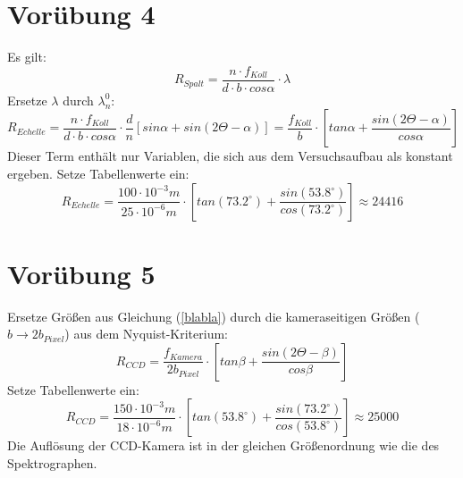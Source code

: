 \documentclass[titlepage]{scrartcl}
\begin{document}
\section{Vorübung 4}
Es gilt:
\begin{equation}
R_{Spalt} = \frac{n\cdot f_{Koll}}{d\cdot b\cdot cos \alpha}\cdot \lambda
\end{equation}
Ersetze $\lambda$ durch $\lambda_n^0$:
\begin{equation}
R_{Echelle} = \frac{n\cdot f_{Koll}}{d\cdot b\cdot cos \alpha}\cdot \frac{d}{n}[sin \alpha + sin(2\Theta-\alpha)] = \frac{f_{Koll}}{b}\cdot [tan \alpha + \frac{sin(2\Theta-\alpha)}{cos \alpha}]
\label{blabla}
\end{equation}
Dieser Term enthält nur Variablen, die sich aus dem Versuchsaufbau als konstant ergeben. 
Setze Tabellenwerte ein:
\begin{equation}
R_{Echelle} = \frac{100 \cdot 10^{-3}m}{25 \cdot 10^{-6}m}\cdot [tan (73.2^{\circ}) + \frac{sin(53.8^{\circ})}{cos (73.2^{\circ})}] \approx 24416
\end{equation}
\section{Vorübung 5}
Ersetze Größen aus Gleichung (\ref{blabla}) durch die kameraseitigen Größen ($b \rightarrow 2b_{Pixel}$) aus dem Nyquist-Kriterium:
\begin{equation}
R_{CCD} = \frac{f_{Kamera}}{2b_{Pixel}}\cdot [tan \beta + \frac{sin(2\Theta-\beta)}{cos \beta}]
\end{equation}
Setze Tabellenwerte ein:
\begin{equation}
R_{CCD} = \frac{150\cdot10^{-3}m}{18\cdot10^{-6}m}\cdot [tan (53.8^{\circ}) + \frac{sin(73.2^{\circ})}{cos (53.8^{\circ})}] \approx 25000
\end{equation}
Die Auflösung der CCD-Kamera ist in der gleichen Größenordnung wie die des Spektrographen. 
\end{document}
